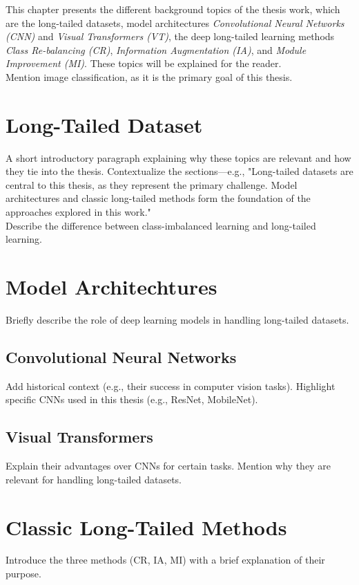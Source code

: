 

This chapter presents the different background topics of the thesis work, which are the long-tailed datasets, model architectures \textit{Convolutional Neural Networks (CNN)} and \textit{Visual Transformers (VT)}, the deep long-tailed learning methods \textit{Class Re-balancing (CR)}, \textit{Information Augmentation (IA)}, 
and \textit{Module Improvement (MI)}. These topics will be explained for the reader.\\

Mention image classification, as it is the primary goal of this thesis. 

\section{Long-Tailed Dataset}
A short introductory paragraph explaining why these topics are relevant and how they tie into the thesis.
Contextualize the sections—e.g., "Long-tailed datasets are central to this thesis, as they represent the primary challenge. Model architectures and classic long-tailed methods form the foundation of the approaches explored in this work."\\

Describe the difference between class-imbalanced learning and long-tailed learning.

\section{Model Architechtures}
Briefly describe the role of deep learning models in handling long-tailed datasets.

\subsection{Convolutional Neural Networks}
Add historical context (e.g., their success in computer vision tasks).
Highlight specific CNNs used in this thesis (e.g., ResNet, MobileNet).

\subsection{Visual Transformers}
Explain their advantages over CNNs for certain tasks.
Mention why they are relevant for handling long-tailed datasets.


\section{Classic Long-Tailed Methods}
Introduce the three methods (CR, IA, MI) with a brief explanation of their purpose.\\

